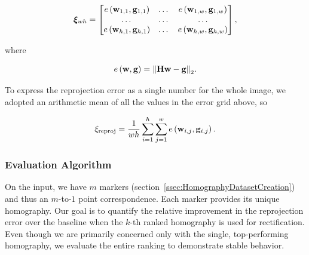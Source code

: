 \begin{equation}
    \label{eq:reprojection_error_grid}
    \boldsymbol{\xi}_{wh} =
    \begin{bmatrix}
        {e} \left( \mathbf{w}_{1, 1}, \mathbf{g}_{1, 1} \right) & \dots & {e} \left( \mathbf{w}_{1, w}, \mathbf{g}_{1, w} \right) \\
        \dots                                        & \dots & \dots                                        \\
        {e} \left( \mathbf{w}_{h, 1}, \mathbf{g}_{h, 1} \right) & \dots & {e} \left( \mathbf{w}_{h, w}, \mathbf{g}_{h, w} \right)
    \end{bmatrix},
\end{equation}

\noindent where

\begin{equation}
    {e} \left( \mathbf{w}, \mathbf{g} \right) = {\left\Vert {\mathbf{H}\mathbf{w}- \mathbf{g}} \right\Vert}_2.
\end{equation}

\noindent To express the reprojection error as a single number for the whole image, we adopted an arithmetic mean of all the values in the error grid above, so

\begin{equation}
    \label{eq:ReprojectionErrorSingle}
    \xi_{\text{reproj}} =
    \frac{1}{wh}
    \sum_{i = 1}^{h}
    \sum_{j = 1}^{w}
    {e} \left( \mathbf{w}_{i, j}, \mathbf{g}_{i, j} \right).
\end{equation}

\subsubsection{Evaluation Algorithm}
\label{sssec:EvaluationAlgorithm}

On the input, we have $m$ markers (section~\ref{ssec:HomographyDatasetCreation}) and thus an $m$-to-$1$ point correspondence. Each marker provides its unique homography. Our goal is to quantify the relative improvement in the reprojection error over the baseline when the $k$-th ranked homography is used for rectification. Even though we are primarily concerned only with the single, top-performing homography, we evaluate the entire ranking to demonstrate stable behavior.

